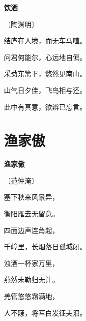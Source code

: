 \documentclass[12pt,UTF-8,openany,fontset=none]{ctexbook}
\begin{document}

\begin{center}
    {\bfseries 饮酒}

    \vspace{18pt}

    \begin{large}\xuwen
        〔陶渊明〕
    \end{large}

\end{center}

    \vspace{18pt}  %

\begin{center}
    \begin{Large}

        结庐在人境，而无车马喧。

        问君何能尔，心远地自偏。

        采菊东篱下，悠然见南山。

        山气日夕佳，飞鸟相与还。

        此中有真意，欲辨已忘言。

    \end{Large}

\end{center}

\vspace{8pt}
\clearpage

\section{渔家傲}


\begin{center}
    {\bfseries 渔家傲}

    \vspace{18pt}

    \begin{large}\xuwen
        〔范仲淹〕
    \end{large}

\end{center}

    \vspace{18pt}  %

\begin{center}
    \begin{Large}

        塞下秋来风景异，

        衡阳雁去无留意。

        四面边声连角起，

        千嶂里，长烟落日孤城闭。

        \vspace{18pt}  %

        浊酒一杯家万里，

        燕然未勒归无计。

        羌管悠悠霜满地，

        人不寐，将军白发征夫泪。

    \end{Large}

\end{center}
\end{document}
